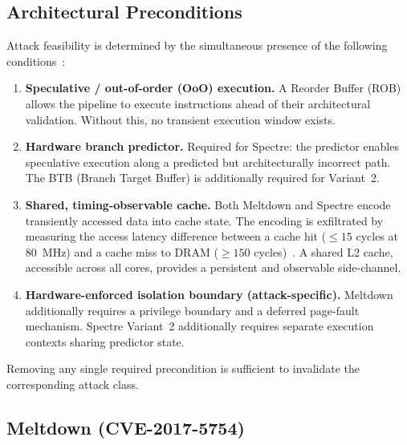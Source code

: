 \subsection{Architectural Preconditions}
\label{subsec:preconditions}

Attack feasibility is determined by the simultaneous presence of the following
conditions~\cite{kocher2019spectre,intel2018analysis,arm2018cache}:

\begin{enumerate}
  \item \textbf{Speculative / out-of-order (OoO) execution.}
        A Reorder Buffer (ROB) allows the pipeline to execute instructions ahead
        of their architectural validation.  Without this, no transient execution
        window exists.
  \item \textbf{Hardware branch predictor.}
        Required for Spectre: the predictor enables speculative execution along
        a predicted but architecturally incorrect path.  The BTB (Branch Target
        Buffer) is additionally required for Variant~2.
  \item \textbf{Shared, timing-observable cache.}
        Both Meltdown and Spectre encode transiently accessed data into cache
        state.  The encoding is exfiltrated by measuring the access latency
        difference between a cache hit ($\leq 15$ cycles at \SI{80}{\mega\hertz})
        and a cache miss to DRAM ($\geq 150$ cycles)~\cite{kocher2019spectre}.
        A shared \mbox{L2} cache, accessible across all cores, provides a
        persistent and observable side-channel.
  \item \textbf{Hardware-enforced isolation boundary (attack-specific).}
        Meltdown additionally requires a privilege boundary and a deferred
        page-fault mechanism.  Spectre Variant~2 additionally requires separate
        execution contexts sharing predictor state.
\end{enumerate}

Removing any single required precondition is sufficient to invalidate the
corresponding attack class.

\subsection{Meltdown (CVE-2017-5754)}
\label{subsec:meltdown}


